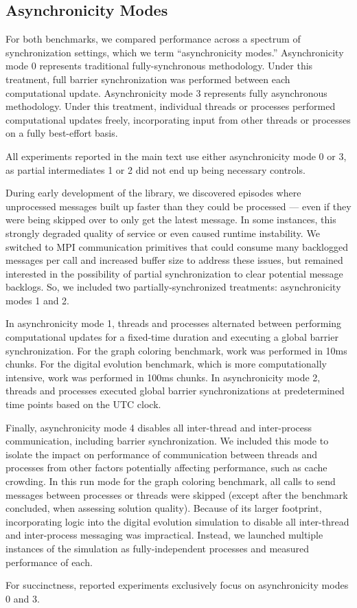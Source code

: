 \subsection{Asynchronicity Modes} \label{sec:asynchronicity_modes}


For both benchmarks, we compared performance across a spectrum of synchronization settings, which we term ``asynchronicity modes.''%
Asynchronicity mode 0 represents traditional fully-synchronous methodology.
Under this treatment, full barrier synchronization was performed between each computational update.
Asynchronicity mode 3 represents fully asynchronous methodology.
Under this treatment, individual threads or processes performed computational updates freely, incorporating input from other threads or processes on a fully best-effort basis.

All experiments reported in the main text use either asynchronicity mode 0 or 3, as partial intermediates 1 or 2 did not end up being necessary controls.

During early development of the library, we discovered episodes where unprocessed messages built up faster than they could be processed --- even if they were being skipped over to only get the latest message.
In some instances, this strongly degraded quality of service or even caused runtime instability.
We switched to MPI communication primitives that could consume many backlogged messages per call and increased buffer size to address these issues, but remained interested in the possibility of partial synchronization to clear potential message backlogs.
So, we included two partially-synchronized treatments: asynchronicity modes 1 and 2.

In asynchronicity mode 1, threads and processes alternated between performing computational updates for a fixed-time duration and executing a global barrier synchronization.
For the graph coloring benchmark, work was performed in 10ms chunks.
For the digital evolution benchmark, which is more computationally intensive, work was performed in 100ms chunks.
In asynchronicity mode 2, threads and processes executed global barrier synchronizations at predetermined time points based on the UTC clock.

Finally, asynchronicity mode 4 disables all inter-thread and inter-process communication, including barrier synchronization.
We included this mode to isolate the impact on performance of communication between threads and processes from other factors potentially affecting performance, such as cache crowding.
In this run mode for the graph coloring benchmark, all calls to send messages between processes or threads were skipped (except after the benchmark concluded, when assessing solution quality).
Because of its larger footprint, incorporating logic into the digital evolution simulation to disable all inter-thread and inter-process messaging was impractical.
Instead, we launched multiple instances of the simulation as fully-independent processes and measured performance of each.

For succinctness, reported experiments exclusively focus on asynchronicity modes 0 and 3.
